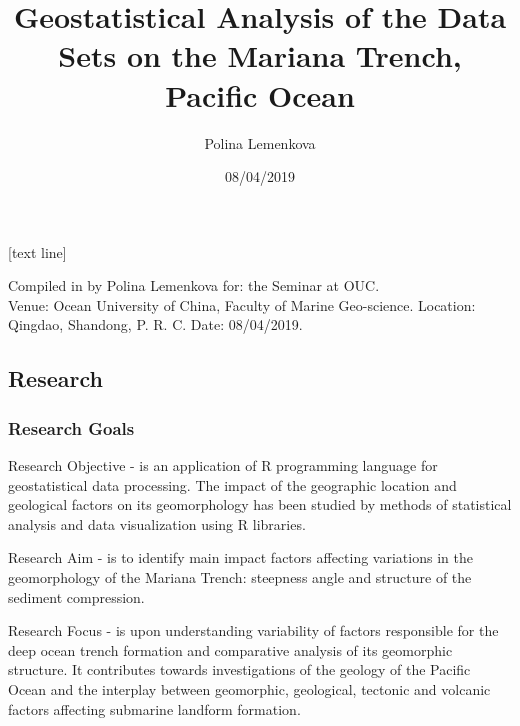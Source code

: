 \documentclass[pdflatex,compress,8pt,
	xcolor={dvipsnames,dvipsnames,svgnames,x11names,table},
	hyperref={colorlinks = true,breaklinks = true, urlcolor = NavyBlue, breaklinks = true}]{beamer}
\title{Geostatistical Analysis of the Data Sets on the Mariana Trench, Pacific Ocean}
\author{Polina Lemenkova}
\institute{Ocean University of China, College of Marine Geo-Sciences}
\date{08/04/2019}
\begin{document}
\maketitle

[text line]{%
\parbox{\linewidth}{\vspace*{-8pt}Compiled in \LuaLaTeX \space by Polina Lemenkova for: the Seminar at OUC.\\ Venue: Ocean University of China, Faculty of Marine Geo-science. Location: Qingdao, Shandong, P. R. C. Date: 08/04/2019.} \hfill\insertpagenumber}




\subsection{Research}

\begin{frame}\frametitle{Research Goals}
	\begin{exampleblock}{Research Objective}
- is an application of R programming language for geostatistical data processing. The impact of the geographic location and geological factors on its geomorphology has been studied by methods of statistical analysis and data visualization using R libraries.
	\end{exampleblock}
	\begin{exampleblock}{Research Aim}
- is to identify main impact factors affecting variations in the geomorphology of the Mariana Trench: steepness angle and structure of the sediment compression. 
	\end{exampleblock}
	\begin{alertblock}{Research Focus}
- is upon understanding variability of factors responsible for the deep ocean trench formation and comparative analysis of its geomorphic structure. It contributes towards investigations of the geology of the Pacific Ocean and the interplay between geomorphic, geological, tectonic and volcanic factors affecting submarine landform formation.
	\end{alertblock}
\end{frame}
	
\end{document}
